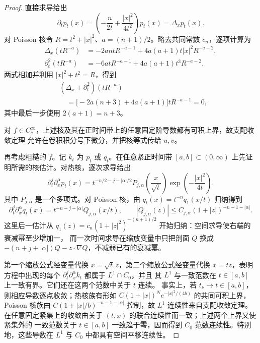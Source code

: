 \begin{proof}
直接求导给出
\[
 \partial_tp_t(x)=
 \left(-\frac n{2t}+\frac{|x|^2}{4t^2}\right)p_t(x)
 =\Delta_xp_t(x).
\]
对 Poisson 核令 $R=t^2+|x|^2$、$a=(n+1)/2$。略去共同常数 $c_n$，逐项计算为
\begin{align*}
 \Delta_x(tR^{-a})
 &=-2antR^{-a-1}+4a(a+1)t|x|^2R^{-a-2},\\
 \partial_t^2(tR^{-a})
 &=-6atR^{-a-1}+4a(a+1)t^3R^{-a-2}.
\end{align*}
两式相加并利用 $|x|^2+t^2=R$，得到
\begin{align*}
 &(\Delta_x+\partial_t^2)(tR^{-a})\\
 &\quad=\bigl[-2a(n+3)+4a(a+1)\bigr]tR^{-a-1}=0,
\end{align*}
其中最后一步使用 $2(a+1)=n+3$。

对 $f\in C_c^\infty$，上述核及其在正时间带上的任意固定阶导数都有可积上界，故支配收敛定理
允许在卷积积分号下微分，并把核等式传给 $u,v$。

再考虑粗糙的 $f$。记 $k_t$ 为 $p_t$ 或 $q_t$。在任意紧正时间带
$[a,b]\subset(0,\infty)$ 上先证明所需的核估计。对热核，逐次求导给出
\[
 \partial_t^j\partial_x^\alpha p_t(x)
 =t^{-n/2-j-|\alpha|/2}
   P_{j,\alpha}\!\left(\frac{x}{\sqrt t}\right)
   \exp\!\left(-\frac{|x|^2}{4t}\right).
\]
其中 $P_{j,\alpha}$ 是一个多项式。对 Poisson 核，由
$q_t(x)=t^{-n}q_1(x/t)$ 归纳得到
\[
 \partial_t^j\partial_x^\alpha q_t(x)
 =t^{-n-j-|\alpha|}Q_{j,\alpha}(x/t),
 \qquad
 |Q_{j,\alpha}(z)|\le
 C_{j,\alpha}(1+|z|)^{-n-1-|\alpha|}.
\]
这里后一估计从
$q_1(z)=c_n(1+|z|^2)^{-(n+1)/2}$ 开始归纳：空间求导使右端的衰减幂至少增加一，
而一次时间求导在缩放变量中只把剖面 $Q$ 换成
$-(n+j+|\alpha|)Q-z\cdot\nabla Q$，不减弱已有的衰减幂。

第一个缩放公式经变量代换 $x=\sqrt t\,z$，第二个缩放公式经变量代换 $x=tz$，表明
方程中出现的每个 $\partial_t^j\partial_x^\alpha k_t$ 都属于 $L^1\cap C_0$，并且
其 $L^1$ 与一致范数在 $t\in[a,b]$ 上一致有界。它们还在这两个范数中关于 $t$ 连续。
事实上，若 $t_\nu\to t\in[a,b]$，则相应导数逐点收敛；热核族有形如
$C(1+|x|)^N e^{-|x|^2/(4b)}$ 的共同可积上界，Poisson 核族由
$C(1+|x|/b)^{-n-1-|\alpha|}$ 控制，故 $L^1$ 连续性来自支配收敛定理。
在任意固定紧集上的收敛由关于 $(t,x)$ 的联合连续性而一致；上述两个上界又使紧集外的
一致范数关于 $t\in[a,b]$ 一致趋于零，因而得到 $C_0$ 范数连续性。特别地，这些导数在
$L^1$ 与 $C_0$ 中都具有空间平移连续性。


\end{proof}

